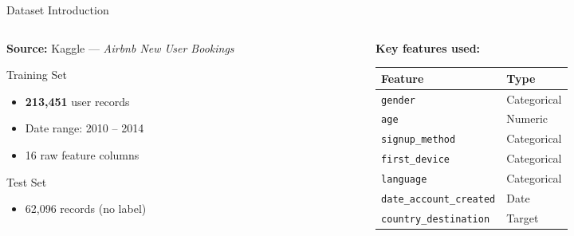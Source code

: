 \documentclass[aspectratio=169]{beamer}
\begin{document}
\begin{frame}{Dataset Introduction}
  \begin{columns}[T]
    \begin{column}{0.55\textwidth}
      \textbf{Source:} Kaggle --- \emph{Airbnb New User Bookings}\\[6pt]
      \begin{block}{Training Set}
        \begin{itemize}
          \item \textbf{213,451} user records
          \item Date range: 2010 -- 2014
          \item 16 raw feature columns
        \end{itemize}
      \end{block}
      \vspace{6pt}
      \begin{block}{Test Set}
        \begin{itemize}
          \item 62,096 records (no label)
        \end{itemize}
      \end{block}
    \end{column}
    \begin{column}{0.42\textwidth}
      \textbf{Key features used:}\\[4pt]
      \begin{tabular}{ll}
        \toprule
        Feature & Type \\
        \midrule
        \texttt{gender}          & Categorical \\
        \texttt{age}             & Numeric \\
        \texttt{signup\_method}  & Categorical \\
        \texttt{first\_device}   & Categorical \\
        \texttt{language}        & Categorical \\
        \texttt{date\_account\_created} & Date \\
        \texttt{country\_destination}   & \alert{Target} \\
        \bottomrule
      \end{tabular}
    \end{column}
  \end{columns}
\end{frame}

\end{document}
